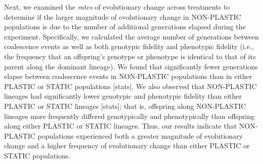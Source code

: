 Next, we examined the \textit{rates} of evolutionary change across treatments to determine if the larger magnitude of evolutionary change in NON-PLASTIC populations is due to the number of additional generations elapsed during the experiment.
Specifically, we calculated the average number of generations between coalescence events as well as both genotypic fidelity and phenotypic fidelity (i.e., the frequency that an offspring's genotype or phenotype is identical to that of its parent along the dominant lineage).
We found that significantly fewer generations elapse between coalescence events in NON-PLASTIC populations than in either PLASTIC or STATIC populations [stats].
We also observed that NON-PLASTIC lineages had significantly lower genotypic and phenotypic fidelity than either PLASTIC or STATIC lineages [stats]; that is, offspring along NON-PLASTIC lineages more frequently differed genotypically and phenotypically than offspring along either PLASTIC or STATIC lineages.
Thus, our results indicate that NON-PLASTIC populations experienced both a greater magnitude of evolutionary change and a higher frequency of evolutionary change than either PLASTIC or STATIC populations.

